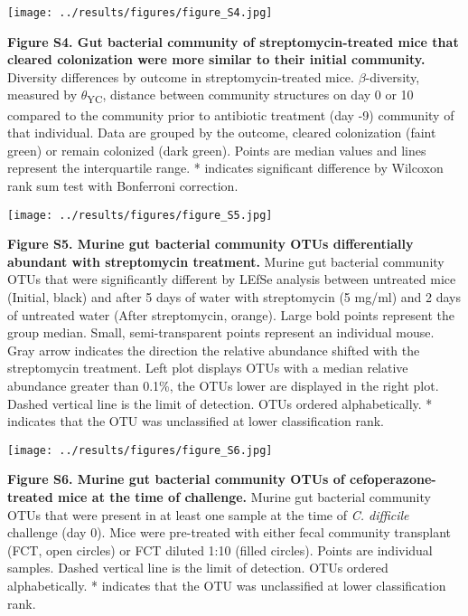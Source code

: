 \documentclass[
  12pt,
]{article}
\begin{document}
\hfill\break

\texttt{[image: ../results/figures/figure\_S4.jpg]}

\textbf{Figure S4. Gut bacterial community of streptomycin-treated mice
that cleared colonization were more similar to their initial community.}
Diversity differences by outcome in streptomycin-treated mice.
\(\beta\)-diversity, measured by \(\theta\)\textsubscript{YC}, distance
between community structures on day 0 or 10 compared to the community
prior to antibiotic treatment (day -9) community of that individual.
Data are grouped by the outcome, cleared colonization (faint green) or
remain colonized (dark green). Points are median values and lines
represent the interquartile range. * indicates significant difference by
Wilcoxon rank sum test with Bonferroni correction.

\hfill\break

\texttt{[image: ../results/figures/figure\_S5.jpg]}

\textbf{Figure S5. Murine gut bacterial community OTUs differentially
abundant with streptomycin treatment.} Murine gut bacterial community
OTUs that were significantly different by LEfSe analysis between
untreated mice (Initial, black) and after 5 days of water with
streptomycin (5 mg/ml) and 2 days of untreated water (After
streptomycin, orange). Large bold points represent the group median.
Small, semi-transparent points represent an individual mouse. Gray arrow
indicates the direction the relative abundance shifted with the
streptomycin treatment. Left plot displays OTUs with a median relative
abundance greater than 0.1\%, the OTUs lower are displayed in the right
plot. Dashed vertical line is the limit of detection. OTUs ordered
alphabetically. * indicates that the OTU was unclassified at lower
classification rank.

\hfill\break

\texttt{[image: ../results/figures/figure\_S6.jpg]}

\textbf{Figure S6. Murine gut bacterial community OTUs of
cefoperazone-treated mice at the time of challenge.} Murine gut
bacterial community OTUs that were present in at least one sample at the
time of \emph{C. difficile} challenge (day 0). Mice were pre-treated
with either fecal community transplant (FCT, open circles) or FCT
diluted 1:10 (filled circles). Points are individual samples. Dashed
vertical line is the limit of detection. OTUs ordered alphabetically. *
indicates that the OTU was unclassified at lower classification rank.
\end{document}
